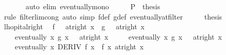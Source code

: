 \begin{isabellebody}
\ \ \ \ \ \ \ {\isacharparenleft}{\kern0pt}auto\ elim{\isacharcolon}{\kern0pt}\ eventually{\isacharunderscore}{\kern0pt}mono{\isacharparenright}{\kern0pt}\isanewline
\ \ \isamarkupfalse%
\ \isamarkupfalse%
\ {\isachardoublequoteopen}{\isacharquery}{\kern0pt}P\ {\isasymlongleftrightarrow}\ {\isacharquery}{\kern0pt}thesis{\isachardoublequoteclose}\isanewline
\ \ \ \ \isamarkupfalse%
\ {\isacharparenleft}{\kern0pt}rule\ filterlim{\isacharunderscore}{\kern0pt}cong{\isacharparenright}{\kern0pt}\ {\isacharparenleft}{\kern0pt}auto\ simp{\isacharcolon}{\kern0pt}\ f{\isacharunderscore}{\kern0pt}def\ g{\isacharunderscore}{\kern0pt}def\ eventually{\isacharunderscore}{\kern0pt}at{\isacharunderscore}{\kern0pt}filter{\isacharparenright}{\kern0pt}\isanewline
\ \ \isamarkupfalse%
\ \isamarkupfalse%
\ {\isacharquery}{\kern0pt}thesis\ \isacommand{{\isachardot}{\kern0pt}}\isamarkupfalse%
\isanewline
{}\isamarkupfalse%
%
\endisatagproof
{\isafoldproof}%
%
\isadelimproof
\isanewline
%
\endisadelimproof
\isanewline
{}\isamarkupfalse%
\ lhopital{\isacharunderscore}{\kern0pt}right{\isacharcolon}{\kern0pt}\isanewline
\ \ {\isachardoublequoteopen}{\isacharparenleft}{\kern0pt}f\ {\isasymlonglongrightarrow}\ {}{\isacharparenright}{\kern0pt}\ {\isacharparenleft}{\kern0pt}at{\isacharunderscore}{\kern0pt}right\ x{\isacharparenright}{\kern0pt}\ {\isasymLongrightarrow}\ {\isacharparenleft}{\kern0pt}g\ {\isasymlonglongrightarrow}\ {}{\isacharparenright}{\kern0pt}\ {\isacharparenleft}{\kern0pt}at{\isacharunderscore}{\kern0pt}right\ x{\isacharparenright}{\kern0pt}\ {\isasymLongrightarrow}\isanewline
\ \ \ \ eventually\ {\isacharparenleft}{\kern0pt}{\isasymlambda}x{\isachardot}{\kern0pt}\ g\ x\ {\isasymnoteq}\ {}{\isacharparenright}{\kern0pt}\ {\isacharparenleft}{\kern0pt}at{\isacharunderscore}{\kern0pt}right\ x{\isacharparenright}{\kern0pt}\ {\isasymLongrightarrow}\isanewline
\ \ \ \ eventually\ {\isacharparenleft}{\kern0pt}{\isasymlambda}x{\isachardot}{\kern0pt}\ g{\isacharprime}{\kern0pt}\ x\ {\isasymnoteq}\ {}{\isacharparenright}{\kern0pt}\ {\isacharparenleft}{\kern0pt}at{\isacharunderscore}{\kern0pt}right\ x{\isacharparenright}{\kern0pt}\ {\isasymLongrightarrow}\isanewline
\ \ \ \ eventually\ {\isacharparenleft}{\kern0pt}{\isasymlambda}x{\isachardot}{\kern0pt}\ DERIV\ f\ x\ {\isacharcolon}{\kern0pt}{\isachargreater}{\kern0pt}\ f{\isacharprime}{\kern0pt}\ x{\isacharparenright}{\kern0pt}\ {\isacharparenleft}{\kern0pt}at{\isacharunderscore}{\kern0pt}right\ x{\isacharparenright}{\kern0pt}\ {\isasymLongrightarrow}\isanewline

\end{isabellebody}
